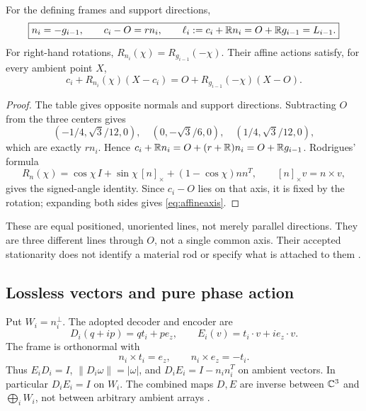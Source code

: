 \begin{proposition}\label{prop:axes}
For the defining frames and support directions,
\begin{equation}
\boxed{n_i=-g_{i-1},\qquad c_i-O=r n_i,\qquad
\ell_i:=c_i+\mathbb R n_i=O+\mathbb R g_{i-1}=L_{i-1}.}
\label{eq:axismatch}
\end{equation}
For right-hand rotations, \(R_{n_i}(\chi)=R_{g_{i-1}}(-\chi)\). Their affine actions satisfy, for every ambient point \(X\),
\begin{equation}
c_i+R_{n_i}(\chi)(X-c_i)
=O+R_{g_{i-1}}(-\chi)(X-O).
\label{eq:affineaxis}
\end{equation}
\end{proposition}
\begin{proof}
The table gives opposite normals and support directions. Subtracting \(O\) from the three centers gives
\[
(-1/4,\sqrt3/12,0),\quad (0,-\sqrt3/6,0),\quad
(1/4,\sqrt3/12,0),
\]
which are exactly \(r n_i\). Hence \(c_i+\mathbb R n_i=O+(r+\mathbb R)n_i=O+\mathbb R g_{i-1}\). Rodrigues' formula
\[
R_n(\chi)=\cos\chi\,I+\sin\chi\,[n]_\times+(1-\cos\chi)nn^T,
\qquad [n]_\times v=n\times v,
\]
gives the signed-angle identity. Since \(c_i-O\) lies on that axis, it is fixed by the rotation; expanding both sides gives \eqref{eq:affineaxis}.
\end{proof}

These are equal positioned, unoriented lines, not merely parallel directions. They are three different lines through \(O\), not a single common axis. Their accepted stationarity does not identify a material rod or specify what is attached to them \cite{fixedgap}.

\subsection{Lossless vectors and pure phase action}
Put \(W_i=n_i^\perp\). The adopted decoder and encoder are
\begin{equation}
D_i(q+ip)=q t_i+p e_z,\qquad
E_i(v)=t_i\cdot v+i e_z\cdot v.
\label{eq:decoder}
\end{equation}
The frame is orthonormal with
\begin{equation}
n_i\times t_i=e_z,\qquad n_i\times e_z=-t_i.
\label{eq:handedness}
\end{equation}
Thus \(E_iD_i=I\), \(\|D_i\omega\|=|\omega|\), and \(D_iE_i=I-n_in_i^T\) on ambient vectors. In particular \(D_iE_i=I\) on \(W_i\). The combined maps \(D,E\) are inverse between \(\mathbb C^3\) and \(\bigoplus_iW_i\), not between arbitrary ambient arrays \cite[State--shell attachment, \texttt{eq:decoder}]{nrg}.

